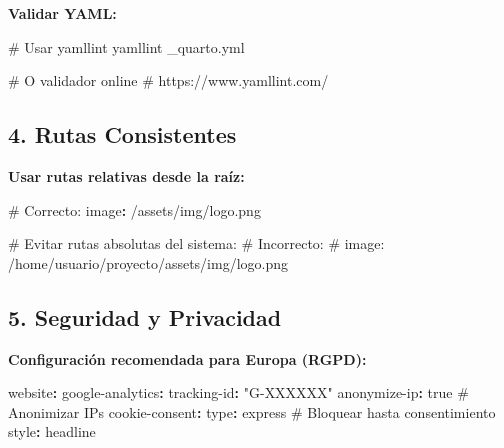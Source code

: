 \documentclass[
  doc,
  floatsintext,
  longtable,
  a4paper,
  nolmodern,
  notxfonts,
  notimes,
  12pt,
  colorlinks=true,linkcolor=blue,citecolor=blue,urlcolor=blue]{apa7}
\newenvironment{Shaded}{\begin{snugshade}}{\end{snugshade}}
\newcommand{\AttributeTok}[1]{\textcolor[rgb]{0.40,0.45,0.13}{#1}}
\newcommand{\CharTok}[1]{\textcolor[rgb]{0.13,0.47,0.30}{#1}}
\newcommand{\CommentTok}[1]{\textcolor[rgb]{0.37,0.37,0.37}{#1}}
\newcommand{\ExtensionTok}[1]{\textcolor[rgb]{0.00,0.23,0.31}{#1}}
\newcommand{\FunctionTok}[1]{\textcolor[rgb]{0.28,0.35,0.67}{#1}}
\newcommand{\KeywordTok}[1]{\textcolor[rgb]{0.00,0.23,0.31}{\textbf{#1}}}
\newcommand{\NormalTok}[1]{\textcolor[rgb]{0.00,0.23,0.31}{#1}}
\newcommand{\StringTok}[1]{\textcolor[rgb]{0.13,0.47,0.30}{#1}}
\begin{document}
\textbf{Validar YAML:}

\begin{Shaded}
\begin{Highlighting}[]
\CommentTok{\# Usar yamllint}
\ExtensionTok{yamllint}\NormalTok{ \_quarto.yml}

\CommentTok{\# O validador online}
\CommentTok{\# https://www.yamllint.com/}
\end{Highlighting}
\end{Shaded}

\subsection{4. Rutas Consistentes}\label{rutas-consistentes}

\textbf{Usar rutas relativas desde la raíz:}

\begin{Shaded}
\begin{Highlighting}[]
\CommentTok{\# Correcto:}
\FunctionTok{image}\KeywordTok{:}\AttributeTok{ /assets/img/logo.png}

\CommentTok{\# Evitar rutas absolutas del sistema:}
\CommentTok{\# Incorrecto:}
\CommentTok{\# image: /home/usuario/proyecto/assets/img/logo.png}
\end{Highlighting}
\end{Shaded}

\subsection{5. Seguridad y Privacidad}\label{seguridad-y-privacidad}

\textbf{Configuración recomendada para Europa (RGPD):}

\begin{Shaded}
\begin{Highlighting}[]
\FunctionTok{website}\KeywordTok{:}
\AttributeTok{  }\FunctionTok{google{-}analytics}\KeywordTok{:}
\AttributeTok{    }\FunctionTok{tracking{-}id}\KeywordTok{:}\AttributeTok{ }\StringTok{"G{-}XXXXXX"}
\AttributeTok{    }\FunctionTok{anonymize{-}ip}\KeywordTok{:}\AttributeTok{ }\CharTok{true}\CommentTok{           \# Anonimizar IPs}
\AttributeTok{    }
\AttributeTok{  }\FunctionTok{cookie{-}consent}\KeywordTok{:}
\AttributeTok{    }\FunctionTok{type}\KeywordTok{:}\AttributeTok{ express}\CommentTok{                \# Bloquear hasta consentimiento}
\AttributeTok{    }\FunctionTok{style}\KeywordTok{:}\AttributeTok{ headline}
\end{Highlighting}
\end{Shaded}
\end{document}
